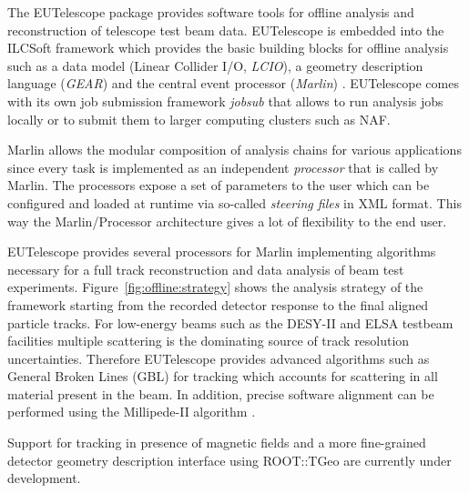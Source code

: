 

The EUTelescope package \cite{Corrin2009} provides software tools for offline analysis and reconstruction of telescope test beam data. 
EUTelescope is embedded into the ILCSoft framework which provides the basic building blocks for offline analysis such as a data model (Linear Collider I/O, \emph{LCIO}),
 a geometry description language (\emph{GEAR}) and the central event processor (\emph{Marlin}) \cite{EUDET-2008-48}. 
EUTelescope comes with its own job submission framework \emph{jobsub} that allows to run analysis jobs locally or to submit them to larger computing clusters such as NAF.

Marlin allows the modular composition of analysis chains for various applications since every task is implemented as an independent \emph{processor} that is called by Marlin. 
The processors expose a set of parameters to the user which can be configured and loaded at runtime via so-called \emph{steering files} in XML format.
This way the Marlin/Processor architecture gives a lot of flexibility to the end user. 

EUTelescope provides several processors for Marlin implementing algorithms necessary for a full track reconstruction and data analysis of beam test experiments. 
Figure~\ref{fig:offline:strategy} shows the analysis strategy of the framework starting from the recorded detector response to the final aligned particle tracks. 
For low-energy beams such as the DESY-II and ELSA testbeam facilities multiple scattering is the dominating source of track resolution uncertainties. 
Therefore EUTelescope provides advanced algorithms such as General Broken Lines (GBL) \cite{Kleinwort-2012} for tracking which accounts for scattering in all material present in the beam. 
In addition, precise software alignment can be performed using the Millipede-II algorithm \cite{Blobel-2006}.

Support for tracking in presence of magnetic fields and a more fine-grained detector geometry description interface using ROOT::TGeo are currently under development.

